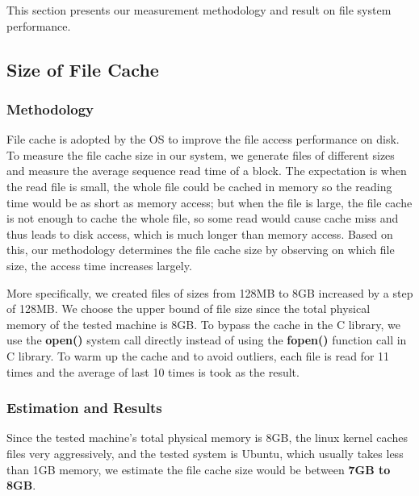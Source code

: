 This section presents our measurement methodology and result on file system performance.

\subsection{Size of File Cache}

\subsubsection{Methodology}
File cache is adopted by the OS to improve the file access performance on disk. To measure the file cache size in our system, we generate files of different sizes and measure the average sequence read time of a block. The expectation is when the read file is small, the whole file could be cached in memory so the reading time would be as short as memory access; but when the file is large, the file cache is not enough to cache the whole file, so some read would cause cache miss and thus
leads to disk access, which is much longer than memory access. Based on this, our methodology determines the file cache size by observing on which file size, the access time increases largely.

More specifically, we created files of sizes from 128MB to 8GB increased by a step of 128MB. We choose the upper bound of file size since the total physical memory of the tested machine is 8GB. To bypass the cache in the C library, we use the \textbf{open()} system call directly instead of using the \textbf{fopen()} function call in C library. To warm up the cache and to avoid outliers, each file is read for 11 times and the average of last 10 times is took as the result.

\subsubsection{Estimation and Results}
\label {File_cache_size_section}
Since the tested machine's total physical memory is 8GB, the linux kernel caches files very aggressively, and the tested system is Ubuntu, which usually takes less than 1GB memory, we estimate the file cache size would be between \textbf{7GB to 8GB}.


